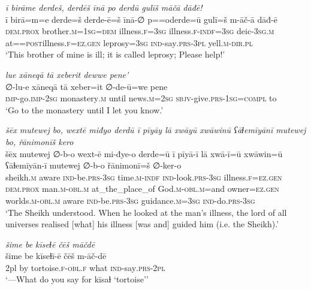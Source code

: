 \ea \label{DG.43}
\textit{ī birāme derdeš, derdēš īnā po derdū gulīš māčā dāđē!} \\ 
\gll ī birā=m=e derde=š derde-ē=š īnā-∅ p==oderde=ū gulī=š m-āč-ā dāđ-ē \\ 
 \textsc{dem.prox} brother\textsc{.m}\textsc{=1sg}\textsc{=dem} illness\textsc{\textsc{.f}}\textsc{=3sg} illness\textsc{\textsc{.f}}\textsc{-indf}\textsc{=3sg} deic\textsc{-3sg}\textsc{.m} at=\textsc{=\textsc{post}}illness\textsc{\textsc{.f}}\textsc{=ez}\textsc{.gen} leprosy\textsc{=3sg} \textsc{ind-}say\textsc{.prs}\textsc{-3pl} yell\textsc{.m}\textsc{-dir}\textsc{.pl} \\ 
\glt `This brother of mine is ill; it is called leprosy; Please help!'
\z 
 
\ea \label{DG.45}
\textit{lue xāneqā tā xeberit dewwe pene’} \\ 
\gll ∅-lu-e xāneqā tā xeber=it ∅-de-ū=we pene \\ 
 \textsc{imp-}go.\textsc{imp-}\textsc{2sg} monastery\textsc{.m} until news\textsc{.m}\textsc{=\textsc{2sg}} \textsc{sbjv-}give\textsc{.prs}\textsc{-1sg}\textsc{=\textsc{compl}} to \\ 
\glt `Go to the monastery until I let you know.'
\z 
 
\ea \label{DG.46}
\textit{šēx mutewej bo, wextē miđyo derdū ī pīyāy lā xwāyū xwāwinū ʕāɫemīyānī mutewej bo, řānimonīš kero} \\ 
\gll šēx mutewej ∅-b-o wext-ē mi-đye-o derde=ū ī pīyā-ī lā xwā-ī=ū xwāwin=ū ʕāɫemīyān-ī mutewej ∅-b-o řānimonī=š ∅-ker-o \\ 
 sheikh\textsc{.m} aware \textsc{ind-}be\textsc{.prs}\textsc{-3sg} time\textsc{.m}\textsc{-indf} \textsc{ind-}look\textsc{.prs}\textsc{-3sg} illness\textsc{\textsc{.f}}\textsc{=ez}\textsc{.gen} \textsc{dem.prox} man\textsc{.m}\textsc{-obl}\textsc{.m} at\_the\_place\_of God\textsc{.m}\textsc{-obl}\textsc{.m}=and owner\textsc{=ez}\textsc{.gen} worlds\textsc{.m}\textsc{-obl}\textsc{.m} aware \textsc{ind-}be\textsc{.prs}\textsc{-3sg} guidance\textsc{.m}\textsc{=3sg} \textsc{ind-}do\textsc{.prs}\textsc{-3sg} \\ 
\glt `The Sheikh understood. When he looked at the man’s illness, the lord of all universes realised [what] his illness [was and] guided him (i.e. the Sheikh).'
\z 
 
\ea \label{DG.48}
\textit{šime be kīseɫē čēš māčdē} \\ 
\gll šime be kīseɫī-ē čēš m-āč-dē \\ 
 2pl by tortoise\textsc{\textsc{.f}}\textsc{-obl}\textsc{\textsc{.f}} what \textsc{ind-}say\textsc{.prs}\textsc{-2pl} \\ 
\glt `—What do you say for kīsaɫ ‘tortoise’'
\z 
 
